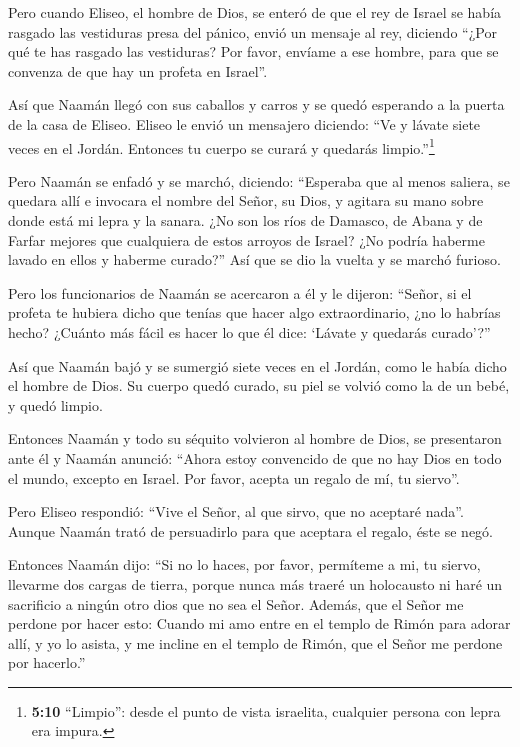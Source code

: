  Pero cuando Eliseo, el hombre de Dios, se enteró de que el
rey de Israel se había rasgado las vestiduras presa del pánico, envió un
mensaje al rey, diciendo ``¿Por qué te has rasgado las vestiduras? Por
favor, envíame a ese hombre, para que se convenza de que hay un profeta
en Israel''.

 Así que Naamán llegó con sus caballos y carros y se quedó
esperando a la puerta de la casa de Eliseo.  Eliseo le
envió un mensajero diciendo: ``Ve y lávate siete veces en el Jordán.
Entonces tu cuerpo se curará y quedarás limpio.''\footnote{\textbf{5:10}
  ``Limpio'': desde el punto de vista israelita, cualquier persona con
  lepra era impura.}

 Pero Naamán se enfadó y se marchó, diciendo: ``Esperaba
que al menos saliera, se quedara allí e invocara el nombre del Señor, su
Dios, y agitara su mano sobre donde está mi lepra y la sanara.
 ¿No son los ríos de Damasco, de Abana y de Farfar mejores
que cualquiera de estos arroyos de Israel? ¿No podría haberme lavado en
ellos y haberme curado?'' Así que se dio la vuelta y se marchó furioso.

 Pero los funcionarios de Naamán se acercaron a él y le
dijeron: ``Señor, si el profeta te hubiera dicho que tenías que hacer
algo extraordinario, ¿no lo habrías hecho? ¿Cuánto más fácil es hacer lo
que él dice: `Lávate y quedarás curado'?''

 Así que Naamán bajó y se sumergió siete veces en el
Jordán, como le había dicho el hombre de Dios. Su cuerpo quedó curado,
su piel se volvió como la de un bebé, y quedó limpio.

 Entonces Naamán y todo su séquito volvieron al hombre de
Dios, se presentaron ante él y Naamán anunció: ``Ahora estoy convencido
de que no hay Dios en todo el mundo, excepto en Israel. Por favor,
acepta un regalo de mí, tu siervo''.

 Pero Eliseo respondió: ``Vive el Señor, al que sirvo, que
no aceptaré nada''. Aunque Naamán trató de persuadirlo para que aceptara
el regalo, éste se negó.

 Entonces Naamán dijo: ``Si no lo haces, por favor,
permíteme a mi, tu siervo, llevarme dos cargas de tierra, porque nunca
más traeré un holocausto ni haré un sacrificio a ningún otro dios que no
sea el Señor.  Además, que el Señor me perdone por hacer
esto: Cuando mi amo entre en el templo de Rimón para adorar allí, y yo
lo asista, y me incline en el templo de Rimón, que el Señor me perdone
por hacerlo.''

